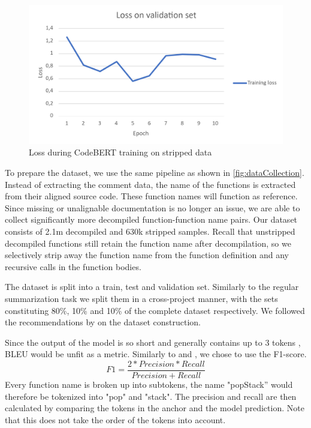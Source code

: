 \label{fig:ExtremeLoss}
\begin{figure}[h]
  \centering
  \includegraphics[width=\linewidth]{img/ExtremeLoss.png}
  \caption{Loss during CodeBERT training on stripped data}
\end{figure}

To prepare the dataset, we use the same pipeline as shown in \ref{fig:dataCollection}. Instead of extracting the comment data, the name of the functions is extracted from their aligned source code. These function names will function as reference. Since missing or unalignable documentation is no longer an issue, we are able to collect significantly more decompiled function-function name pairs. Our dataset consists of 2.1m decompiled and 630k stripped samples. Recall that unstripped decompiled functions still retain the function name after decompilation, so we selectively strip away the function name from the function definition and any recursive calls in the function bodies. 

The dataset is split into a train, test and validation set. Similarly to the regular summarization task we split them in a cross-project manner, with the sets constituting 80\%, 10\% and 10\% of the complete dataset respectively. We followed the recommendations by  \citeauthor{recommend_summarization} on the dataset construction. 

Since the output of the model is so short and generally contains up to 3 tokens \cite{ExtremeSummarization}, BLEU would be unfit as a metric. Similarly to \citeauthor{ExtremeSummarization} and \citeauthor{PolyglotCodeBERT}, we chose to use the F1-score.
\[F1 = \frac{2*Precision*Recall}{Precision+Recall}\] 
Every function name is broken up into subtokens, the name "popStack'' would therefore be tokenized into "pop" and "stack". The precision and recall are then calculated by comparing the tokens in the anchor and the model prediction. Note that this does not take the order of the tokens into account.


